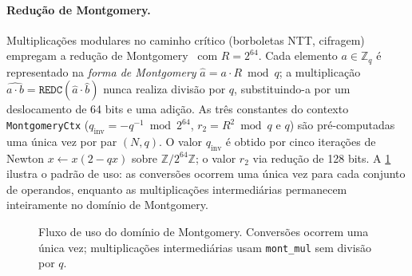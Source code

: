 \documentclass[11pt,a4paper]{article}
\begin{document}
\paragraph{Redução de Montgomery.}
Multiplicações modulares no caminho crítico (borboletas NTT, cifragem) empregam
a redução de Montgomery~\cite{Montgomery1985} com $R = 2^{64}$. Cada elemento
$a \in \mathbb{Z}_q$ é representado na \emph{forma de Montgomery}
$\hat{a} = a \cdot R \bmod q$; a multiplicação
$\widehat{a \cdot b} = \texttt{REDC}(\hat{a} \cdot \hat{b})$ nunca realiza divisão
por $q$, substituindo-a por um deslocamento de 64 bits e uma adição. As três
constantes do contexto \texttt{MontgomeryCtx} ($q_{\text{inv}} = -q^{-1} \bmod 2^{64}$,
$r_2 = R^2 \bmod q$ e $q$) são pré-computadas uma única vez por par $(N, q)$.
O valor $q_{\text{inv}}$ é obtido por cinco iterações de Newton $x \leftarrow x(2-qx)$
sobre $\mathbb{Z}/2^{64}\mathbb{Z}$; o valor $r_2$ via redução de 128 bits. A
\cref{fig:montgomery_flow} ilustra o padrão de uso: as conversões ocorrem uma única
vez para cada conjunto de operandos, enquanto as multiplicações intermediárias
permanecem inteiramente no domínio de Montgomery.

\begin{figure}[ht]
\centering
{}
\caption{Fluxo de uso do domínio de Montgomery. Conversões ocorrem uma única vez;
multiplicações intermediárias usam \texttt{mont\_mul} sem divisão por $q$.}
\label{fig:montgomery_flow}
\end{figure}
\end{document}
